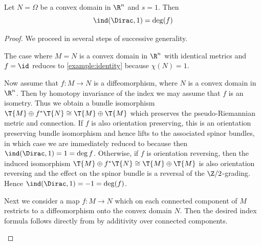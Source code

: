 \documentclass[a4paper,11pt]{amsart}
\numberwithin{equation}{section}
\begin{document}
\begin{theorem}\label{the_index_theorem}
    Let \(N = \Omega\) be a convex domain in \(\R^n\) and \(s = 1\). Then
    \[
        \ind(\Dirac, 1) = \deg(f)  
    \]
\end{theorem}
\begin{proof}
    We proceed in several steps of successive generality.
    
\begin{enumerate*}
    \item \label{case_identity} The case where \(M = N\) is a convex domain in \(\R^n\) with identical metrics and \(f = \id\) reduces to \cref{example:identity} because \(\chi(N) = 1\).
\end{enumerate*}

\begin{enumerate*}[resume]
    \item \label{case_diffeomorphism} Now assume that \(f \colon M \to N\) is a diffeomorphism, where \(N\) is a convex domain in \(\R^n\).
    Then by homotopy invariance of the index we may assume that \(f\) is an isometry.
    Thus we obtain a bundle isomorphism \(\T{M} \oplus f^\ast \T{N} \cong \T{M} \oplus \T{M}\) which preserves the pseudo-Riemannian metric and connection.
    If \(f\) is also orientation preserving, this is an orientation preserving bundle isomorphism and hence lifts to the associated spinor bundles, in which case we are immediately reduced to  because then \(\ind(\Dirac, 1) = 1 = \deg{f}\).
    Otherwise, if \(f\) is orientation reversing, then the induced isomorphism \(\T{M} \oplus f^\ast \T{N} \cong \T{M} \oplus \T{M}\) is also orientation reversing and the effect on the spinor bundle is a reversal of the \(\Z/2\)-grading.
    Hence \(\ind(\Dirac, 1) = -1 = \deg(f)\).
\end{enumerate*}

\begin{enumerate*}[resume]
    \item \label{case_local_diffeomorphism} Next we consider a map \(f \colon M \to N\) which on each connected component of \(M\) restricts to a diffeomorphism onto the convex domain \(N\).
    Then the desired index formula follows directly from  by additivity over connected components.
\end{enumerate*}


\end{proof}
\end{document}

